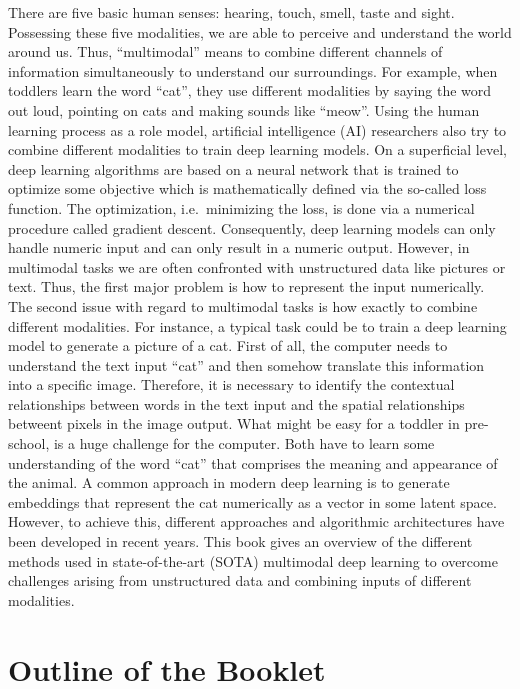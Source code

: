 \documentclass[
]{krantz}
\begin{document}
There are five basic human senses: hearing, touch, smell, taste and sight. Possessing these five modalities, we are able to perceive and understand the world around us. Thus, ``multimodal'' means to combine different channels of information simultaneously to understand our surroundings. For example, when toddlers learn the word ``cat'', they use different modalities by saying the word out loud, pointing on cats and making sounds like ``meow''. Using the human learning process as a role model, artificial intelligence (AI) researchers also try to combine different modalities to train deep learning models. On a superficial level, deep learning algorithms are based on a neural network that is trained to optimize some objective which is mathematically defined via the so-called loss function. The optimization, i.e.~minimizing the loss, is done via a numerical procedure called gradient descent. Consequently, deep learning models can only handle numeric input and can only result in a numeric output. However, in multimodal tasks we are often confronted with unstructured data like pictures or text. Thus, the first major problem is how to represent the input numerically. The second issue with regard to multimodal tasks is how exactly to combine different modalities. For instance, a typical task could be to train a deep learning model to generate a picture of a cat. First of all, the computer needs to understand the text input ``cat'' and then somehow translate this information into a specific image. Therefore, it is necessary to identify the contextual relationships between words in the text input and the spatial relationships betweent pixels in the image output. What might be easy for a toddler in pre-school, is a huge challenge for the computer. Both have to learn some understanding of the word ``cat'' that comprises the meaning and appearance of the animal. A common approach in modern deep learning is to generate embeddings that represent the cat numerically as a vector in some latent space. However, to achieve this, different approaches and algorithmic architectures have been developed in recent years. This book gives an overview of the different methods used in state-of-the-art (SOTA) multimodal deep learning to overcome challenges arising from unstructured data and combining inputs of different modalities.

\hypertarget{outline-of-the-booklet}{%
\section{Outline of the Booklet}\label{outline-of-the-booklet}}
\end{document}
